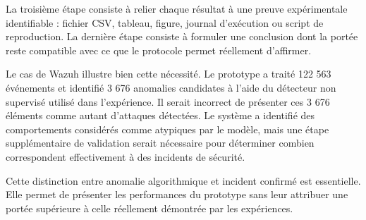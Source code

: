 La troisième étape consiste à relier chaque résultat à une preuve expérimentale identifiable : fichier CSV, tableau, figure, journal d'exécution ou script de reproduction. La dernière étape consiste à formuler une conclusion dont la portée reste compatible avec ce que le protocole permet réellement d'affirmer.

Le cas de Wazuh illustre bien cette nécessité. Le prototype a traité 122 563 événements et identifié 3 676 anomalies candidates à l'aide du détecteur non supervisé utilisé dans l'expérience. Il serait incorrect de présenter ces 3 676 éléments comme autant d'attaques détectées. Le système a identifié des comportements considérés comme atypiques par le modèle, mais une étape supplémentaire de validation serait nécessaire pour déterminer combien correspondent effectivement à des incidents de sécurité.

Cette distinction entre anomalie algorithmique et incident confirmé est essentielle. Elle permet de présenter les performances du prototype sans leur attribuer une portée supérieure à celle réellement démontrée par les expériences.
